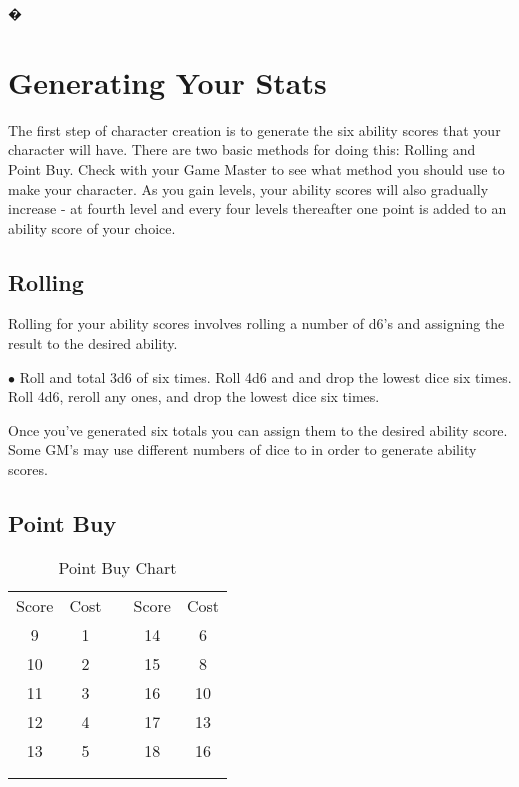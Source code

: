 �\section{Generating Your Stats}

The first step of character creation is to generate the six ability scores that your character will have. There are two basic methods for doing this: Rolling and Point Buy. Check with your Game Master to see what method you should use to make your character.  As you gain levels, your ability scores will also gradually increase - at fourth level and every four levels thereafter one point is added to an ability score of your choice.

\subsection{Rolling}

Rolling for your ability scores involves rolling a number of d6's and assigning the result to the desired ability.
\begin{list}{$\bullet$}{\itemspace}
	 Roll and total 3d6 of six times.
	 Roll 4d6 and and drop the lowest dice six times.
	 Roll 4d6, reroll any ones, and drop the lowest dice six times.
\end{list}
\vspace*{10pt}
Once you've generated six totals you can assign them to the desired ability score.  Some GM's may use different numbers of dice to in order to generate ability scores.

\subsection{Point Buy}

\setlength{\intextsep}{-5pt}
\begin{wraptable}{O}{2in}
\caption{Point Buy Chart}
\begin{tabular}{c|c c c|c}
Score & Cost & & Score & Cost \\
9  & 1       & & 14 & 6       \\
10 & 2       & & 15 & 8       \\
11 & 3       & & 16 & 10      \\
12 & 4       & & 17 & 13      \\
13 & 5       & & 18 & 16      \\
\multicolumn{4}{c}{} \\
\multicolumn{4}{c}{} \\
\end{tabular}
\end{wraptable}
\setlength{\intextsep}{12pt}

